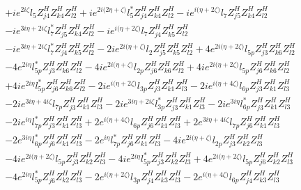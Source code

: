 \begin{align}
 &+i e^{2 i \zeta } l_5 Z_{{j 4}}^{H} Z_{{k 4}}^{H} Z_{{l 2}}^{H} +i e^{2 i \Big(2 \eta +\zeta \Big)} l_5^* Z_{{j 4}}^{H} Z_{{k 4}}^{H} Z_{{l 2}}^{H} -i e^{i \Big(\eta +2 \zeta \Big)} l_7 Z_{{j 5}}^{H} Z_{{k 4}}^{H} Z_{{l 2}}^{H} \nonumber \\ 
 &-i e^{3 i \eta +2 i \zeta } l_7^* Z_{{j 5}}^{H} Z_{{k 4}}^{H} Z_{{l 2}}^{H} -i e^{i \Big(\eta +2 \zeta \Big)} l_7 Z_{{j 4}}^{H} Z_{{k 5}}^{H} Z_{{l 2}}^{H} \nonumber \\ 
 &-i e^{3 i \eta +2 i \zeta } l_7^* Z_{{j 4}}^{H} Z_{{k 5}}^{H} Z_{{l 2}}^{H} -2 i e^{2 i \Big(\eta +\zeta \Big)} l_2 Z_{{j 5}}^{H} Z_{{k 5}}^{H} Z_{{l 2}}^{H} +4 e^{2 i \Big(\eta +2 \zeta \Big)} l_{5p} Z_{{j 3}}^{H} Z_{{k 6}}^{H} Z_{{l 2}}^{H} \nonumber \\ 
 &-4 e^{2 i \eta } l_{5p}^* Z_{{j 3}}^{H} Z_{{k 6}}^{H} Z_{{l 2}}^{H} -4 i e^{2 i \Big(\eta +\zeta \Big)} l_{2p} Z_{{j 6}}^{H} Z_{{k 6}}^{H} Z_{{l 2}}^{H} +4 i e^{2 i \Big(\eta +2 \zeta \Big)} l_{5p} Z_{{j 6}}^{H} Z_{{k 6}}^{H} Z_{{l 2}}^{H} \nonumber \\ 
 &+4 i e^{2 i \eta } l_{5p}^* Z_{{j 6}}^{H} Z_{{k 6}}^{H} Z_{{l 2}}^{H} -2 i e^{i \Big(\eta +2 \zeta \Big)} l_{3p} Z_{{j 3}}^{H} Z_{{k 1}}^{H} Z_{{l 3}}^{H} -2 i e^{i \Big(\eta +4 \zeta \Big)} l_{6p} Z_{{j 3}}^{H} Z_{{k 1}}^{H} Z_{{l 3}}^{H} \nonumber \\ 
 &-2 i e^{3 i \eta +4 i \zeta } l_{7p} Z_{{j 3}}^{H} Z_{{k 1}}^{H} Z_{{l 3}}^{H} -2 i e^{3 i \eta +2 i \zeta } l_{3p}^* Z_{{j 3}}^{H} Z_{{k 1}}^{H} Z_{{l 3}}^{H} -2 i e^{3 i \eta } l_{6p}^* Z_{{j 3}}^{H} Z_{{k 1}}^{H} Z_{{l 3}}^{H} \nonumber \\ 
 &-2 i e^{i \eta } l_{7p}^* Z_{{j 3}}^{H} Z_{{k 1}}^{H} Z_{{l 3}}^{H} +2 e^{i \Big(\eta +4 \zeta \Big)} l_{6p} Z_{{j 6}}^{H} Z_{{k 1}}^{H} Z_{{l 3}}^{H} +2 e^{3 i \eta +4 i \zeta } l_{7p} Z_{{j 6}}^{H} Z_{{k 1}}^{H} Z_{{l 3}}^{H} \nonumber \\ 
 &-2 e^{3 i \eta } l_{6p}^* Z_{{j 6}}^{H} Z_{{k 1}}^{H} Z_{{l 3}}^{H} -2 e^{i \eta } l_{7p}^* Z_{{j 6}}^{H} Z_{{k 1}}^{H} Z_{{l 3}}^{H} -4 i e^{2 i \Big(\eta +\zeta \Big)} l_{2p} Z_{{j 3}}^{H} Z_{{k 2}}^{H} Z_{{l 3}}^{H} \nonumber \\ 
 &-4 i e^{2 i \Big(\eta +2 \zeta \Big)} l_{5p} Z_{{j 3}}^{H} Z_{{k 2}}^{H} Z_{{l 3}}^{H} -4 i e^{2 i \eta } l_{5p}^* Z_{{j 3}}^{H} Z_{{k 2}}^{H} Z_{{l 3}}^{H} +4 e^{2 i \Big(\eta +2 \zeta \Big)} l_{5p} Z_{{j 6}}^{H} Z_{{k 2}}^{H} Z_{{l 3}}^{H} \nonumber \\ 
 &-4 e^{2 i \eta } l_{5p}^* Z_{{j 6}}^{H} Z_{{k 2}}^{H} Z_{{l 3}}^{H} -2 e^{i \Big(\eta +2 \zeta \Big)} l_{3p} Z_{{j 4}}^{H} Z_{{k 3}}^{H} Z_{{l 3}}^{H} -2 e^{i \Big(\eta +4 \zeta \Big)} l_{6p} Z_{{j 4}}^{H} Z_{{k 3}}^{H} Z_{{l 3}}^{H} \nonumber \\ 

\end{align}
